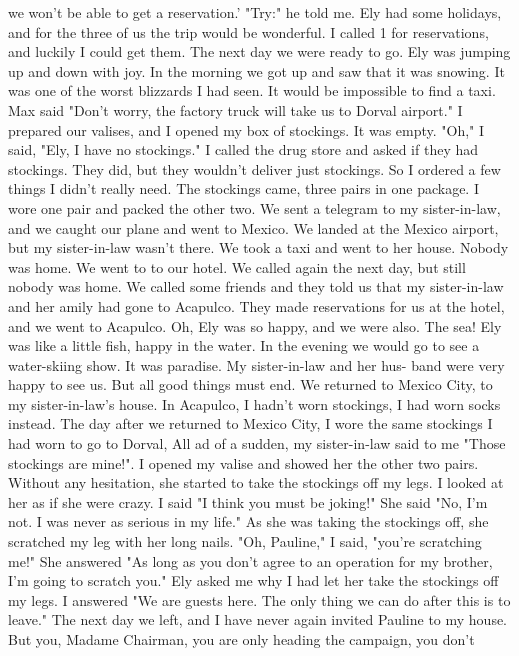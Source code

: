 we won't be able to get a reservation.' "Try:" he told me. Ely had some 
holidays, and for the three of us the trip would be wonderful. I called 
1 for reservations, and luckily I could get them. The next day we were ready to go. Ely was jumping up and down with joy. 
In the morning we got up and saw that it was snowing. It was one of 
the worst blizzards I had seen. It would be impossible to find a taxi. 
Max said "Don't worry, the factory truck will take us to Dorval airport." 
I prepared our valises, and I opened my box of stockings. It was empty. 
"Oh," I said, "Ely, I have no stockings." I called the drug store and asked 
 if they had stockings. They did, but they wouldn't deliver just stockings. 
So I ordered a few things I didn't really need. The stockings came, three 
pairs in one package. I wore one pair and packed the other two. We sent 
a telegram to my sister-in-law, and we caught our plane and went to Mexico. 
We landed at the Mexico airport, but my sister-in-law wasn't 
there. We took a taxi and went to her house. Nobody was home. We went to 
to our hotel. We called again the next day, but still nobody was home. 
We called some friends and they told us that my sister-in-law and her amily 
had gone to Acapulco. They made reservations for us at the hotel, and we 
went to Acapulco. Oh, Ely was so happy, and we were also. The sea! Ely 
was like a little fish, happy in the water. In the evening we would go to 
see a water-skiing show. It was paradise. My sister-in-law and her hus-
band were very happy to see us. But all good things must end. 
We returned to Mexico City, to my sister-in-law's house. In Acapulco, I hadn't worn stockings, I had worn socks instead. The day after we returned to Mexico City, I wore the same stockings I had worn to go to Dorval, All ad of a sudden, my sister-in-law said to me "Those stockings are mine!". I opened my valise and showed her the other two pairs. 
Without any hesitation, she started to take the stockings off my legs. I 
looked at her as if she were crazy. I said "I think you must be joking!" 
She said "No, I'm not. I was never as serious in my life." As she was 
taking the stockings off, she scratched my leg with her long nails. "Oh, 
Pauline," I said, "you're scratching me!" She answered "As long as you don’t 
agree to an operation for my brother, I'm going to scratch you." Ely asked 
me why I had let her take the stockings off my legs. I answered "We are 
guests here. The only thing we can do after this is to leave." The next 
day we left, and I have never again invited Pauline to my house. 
But you, Madame Chairman, you are only heading the campaign, you don't 
